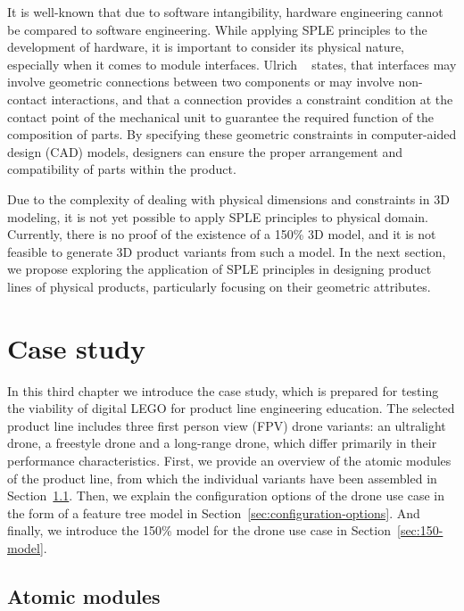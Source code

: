 \documentclass[sigconf,review]{acmart}
\begin{document}
It is well-known that due to software intangibility, hardware engineering cannot be compared to software engineering. 
While applying SPLE principles to the development of hardware, it is important to consider its physical nature, especially when it comes to module interfaces. 
Ulrich ~\cite{Ulrich_1995} states, that interfaces may involve geometric connections between two components or may involve non-contact interactions,  
and that a connection provides a constraint condition at the contact point of the mechanical unit to guarantee the required function of the composition of parts. 
By specifying these geometric constraints in computer-aided design (CAD) models, designers can ensure the proper arrangement and compatibility of parts within the product.

Due to the complexity of dealing with physical dimensions and constraints in 3D modeling, it is not yet possible to apply SPLE principles to physical domain.  
Currently, there is no proof of the existence of a 150\% 3D model, and it is not feasible to generate 3D product variants from such a model. 
In the next section, we propose exploring the application of SPLE principles in designing product lines of physical products, particularly focusing on their geometric attributes.

\section{Case study}
\label{sec:case-study}

In this third chapter we introduce the case study, which is prepared for testing the viability of digital LEGO for product line engineering education.
The selected product line includes three first person view (FPV) drone variants: an ultralight drone, a freestyle drone and a long-range drone, which differ primarily in their performance characteristics.
First, we provide an overview of the atomic modules of the product line, from which the individual variants have been assembled in Section~\ref{sec:atomic-modules}.
Then, we explain the configuration options of the drone use case in the form of a feature tree model in Section~\ref{sec:configuration-options}.
And finally, we introduce the 150\% model for the drone use case in Section~\ref{sec:150-model}.

\subsection{Atomic modules}
\label{sec:atomic-modules}
\end{document}
